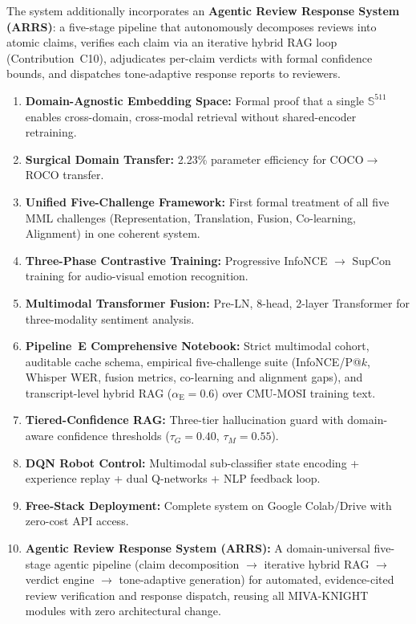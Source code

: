 \documentclass[12pt,a4paper]{article}
\theoremstyle{definition}
\theoremstyle{plain}
\theoremstyle{remark}
\newcommand{\Sph}{\mathbb{S}}
\begin{document}
The system additionally incorporates an \textbf{Agentic Review Response System (ARRS)}: 
a five-stage pipeline that autonomously decomposes reviews into atomic claims, 
verifies each claim via an iterative hybrid RAG loop (Contribution~C10), 
adjudicates per-claim verdicts with formal confidence bounds, and dispatches 
tone-adaptive response reports to reviewers.
\begin{tcolorbox}[keybox,title={Summary of Contributions}]
\begin{enumerate}[label=\textbf{C\arabic*.}]
  \item \textbf{Domain-Agnostic Embedding Space:} Formal proof that a single $\Sph^{511}$ enables cross-domain, cross-modal retrieval without shared-encoder retraining.
  \item \textbf{Surgical Domain Transfer:} 2.23\% parameter efficiency for COCO$\to$ROCO transfer.
  \item \textbf{Unified Five-Challenge Framework:} First formal treatment of all five MML challenges (Representation, Translation, Fusion, Co-learning, Alignment) in one coherent system.
  \item \textbf{Three-Phase Contrastive Training:} Progressive InfoNCE $\to$ SupCon training for audio-visual emotion recognition.
  \item \textbf{Multimodal Transformer Fusion:} Pre-LN, 8-head, 2-layer Transformer for three-modality sentiment analysis.
  \item \textbf{Pipeline~E Comprehensive Notebook:} Strict multimodal cohort, auditable cache schema, empirical five-challenge suite (InfoNCE/P@$k$, Whisper WER, fusion metrics, co-learning and alignment gaps), and transcript-level hybrid RAG ($\alpha_{\text{E}}=0.6$) over CMU-MOSI training text.
  \item \textbf{Tiered-Confidence RAG:} Three-tier hallucination guard with domain-aware confidence thresholds ($\tau_G=0.40$, $\tau_M=0.55$).
  \item \textbf{DQN Robot Control:} Multimodal sub-classifier state encoding + experience replay + dual Q-networks + NLP feedback loop.
  \item \textbf{Free-Stack Deployment:} Complete system on Google Colab/Drive with zero-cost API access.
  \item \textbf{Agentic Review Response System (ARRS):} A domain-universal five-stage agentic pipeline (claim decomposition $\to$ iterative hybrid RAG $\to$ verdict engine $\to$ tone-adaptive generation) for automated, evidence-cited review verification and response dispatch, reusing all MIVA-KNIGHT modules with zero architectural change.
\end{enumerate}
\end{tcolorbox}
\end{document}
